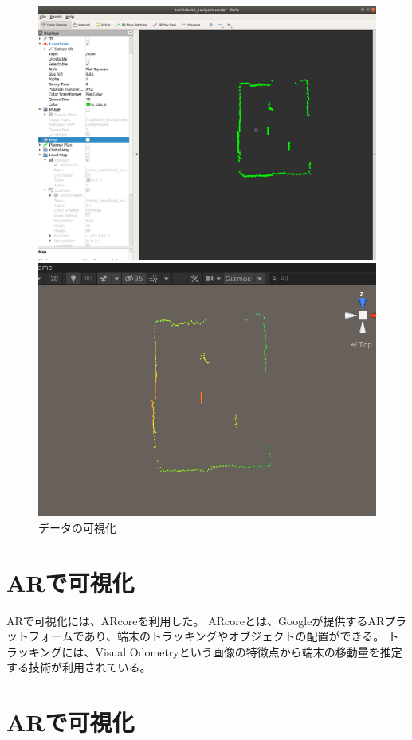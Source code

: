 \begin{figure}[H]
  \begin{minipage}[b]{0.45\linewidth}
    \centering
    \includegraphics[keepaspectratio, width=.9\hsize]{figs/Rviz_Lidar.png}
  \end{minipage}
  \begin{minipage}[b]{0.45\linewidth}
    \centering
    \includegraphics[keepaspectratio, width=.9\hsize]{figs/Unity_Lidar.png}
  \end{minipage}
  \caption{データの可視化}\label{VisRosUni}
\end{figure}


\section{ARで可視化}

ARで可視化には、ARcoreを利用した。
ARcoreとは、Googleが提供するARプラットフォームであり、端末のトラッキングやオブジェクトの配置ができる。
トラッキングには、Visual Odometryという画像の特徴点から端末の移動量を推定する技術が利用されている。


\section{ARで可視化}

